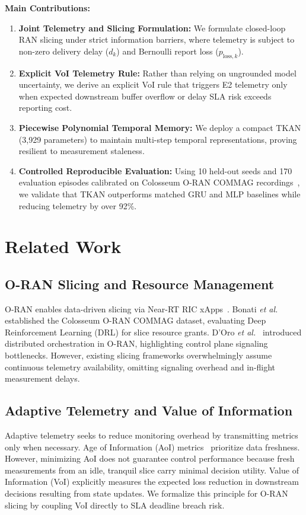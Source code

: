 \documentclass[conference]{IEEEtran}
\begin{document}
\textbf{Main Contributions:}
\begin{enumerate}
    \item \textbf{Joint Telemetry and Slicing Formulation:} We formulate closed-loop RAN slicing under strict information barriers, where telemetry is subject to non-zero delivery delay ($d_k$) and Bernoulli report loss ($p_{\text{loss}, k}$).
    \item \textbf{Explicit VoI Telemetry Rule:} Rather than relying on ungrounded model uncertainty, we derive an explicit VoI rule that triggers E2 telemetry only when expected downstream buffer overflow or delay SLA risk exceeds reporting cost.
    \item \textbf{Piecewise Polynomial Temporal Memory:} We deploy a compact TKAN (3,929 parameters) to maintain multi-step temporal representations, proving resilient to measurement staleness.
    \item \textbf{Controlled Reproducible Evaluation:} Using 10 held-out seeds and 170 evaluation episodes calibrated on Colosseum O-RAN COMMAG recordings~\cite{bonati2021intelligence}, we validate that TKAN outperforms matched GRU and MLP baselines while reducing telemetry by over 92\%.
\end{enumerate}

\section{Related Work}
\subsection{O-RAN Slicing and Resource Management}
O-RAN enables data-driven slicing via Near-RT RIC xApps~\cite{polese2023understanding}. Bonati \textit{et al.}~\cite{bonati2021intelligence} established the Colosseum O-RAN COMMAG dataset, evaluating Deep Reinforcement Learning (DRL) for slice resource grants. D'Oro \textit{et al.}~\cite{doro2022dinos} introduced distributed orchestration in O-RAN, highlighting control plane signaling bottlenecks. However, existing slicing frameworks overwhelmingly assume continuous telemetry availability, omitting signaling overhead and in-flight measurement delays.

\subsection{Adaptive Telemetry and Value of Information}
Adaptive telemetry seeks to reduce monitoring overhead by transmitting metrics only when necessary. Age of Information (AoI) metrics~\cite{sun2019age, kosta2017age} prioritize data freshness. However, minimizing AoI does not guarantee control performance because fresh measurements from an idle, tranquil slice carry minimal decision utility. Value of Information (VoI) explicitly measures the expected loss reduction in downstream decisions resulting from state updates. We formalize this principle for O-RAN slicing by coupling VoI directly to SLA deadline breach risk.
\end{document}
